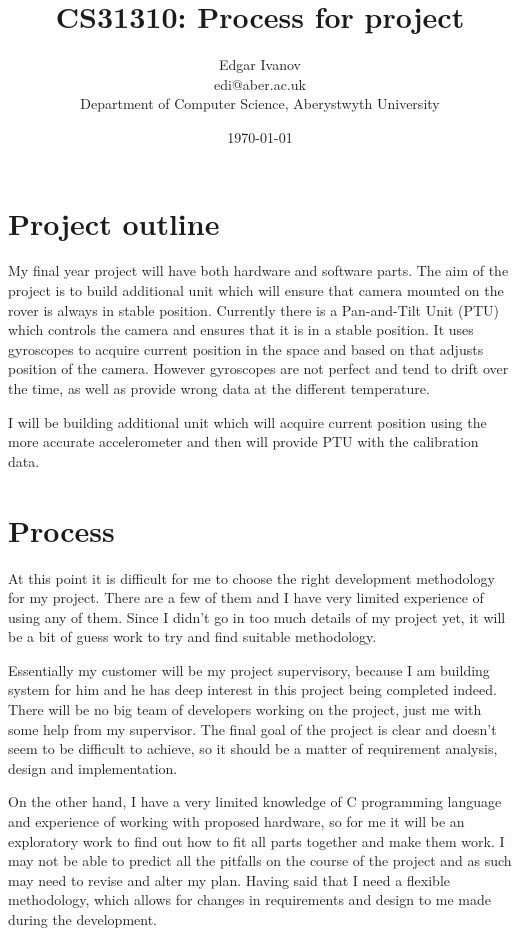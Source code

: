 \documentclass[]{report}
\begin{document}
\title{CS31310: Process for project}
\author{Edgar Ivanov\\ edi@aber.ac.uk \\ Department of Computer Science, Aberystwyth University}
\date{\today}
\maketitle
\section*{Project outline}
My final year project will have both hardware and software parts. The aim of the project is to build additional unit which will ensure that camera mounted on the rover is always in stable position. Currently there is a Pan-and-Tilt Unit (PTU) which controls the camera and ensures that it is in a stable position. It uses gyroscopes to acquire current position in the space and based on that adjusts position of the camera. However gyroscopes are not perfect and tend to drift over the time, as well as provide wrong data at the different temperature. 

I will be building additional unit which will acquire current position using the more accurate accelerometer and then will provide PTU with the calibration data.

\section*{Process}
At this point it is difficult for me to choose the right development methodology for my project. There are a few of them and I have very limited experience of using any of them. Since I didn't go in too much details of my project yet, it will be a bit of guess work to try and find suitable methodology.

Essentially my customer will be my project supervisory, because I am building system for him and he has deep interest in this project being completed indeed. There will be no big team of developers working on the project, just me with some help from my supervisor. The final goal of the project is clear and doesn't seem to be difficult to achieve, so it should be a matter of requirement analysis, design and implementation.

On the other hand, I have a very limited knowledge of C programming language and experience of working with proposed hardware, so for me it will be an exploratory work to find out how to fit all parts together and make them work. I may not be able to predict all the pitfalls on the course of the project and as such may need to revise and alter my plan. Having said that I need a flexible methodology, which allows for changes in requirements and design to me made during the development. 
\end{document}
